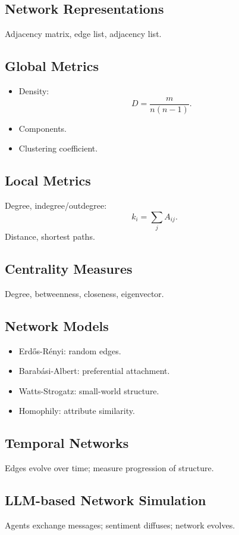 \documentclass[12pt]{article}
\begin{document}
\subsection*{Network Representations}
Adjacency matrix, edge list, adjacency list.

\subsection*{Global Metrics}
\begin{itemize}
    \item Density: 
    \[
    D = \frac{m}{n(n-1)}.
    \]
    \item Components.
    \item Clustering coefficient.
\end{itemize}

\subsection*{Local Metrics}
Degree, indegree/outdegree:
\[
k_i = \sum_j A_{ij}.
\]
Distance, shortest paths.

\subsection*{Centrality Measures}
Degree, betweenness, closeness, eigenvector.

\subsection*{Network Models}
\begin{itemize}
    \item Erd\H{o}s-R\'enyi: random edges.
    \item Barab\'asi-Albert: preferential attachment.
    \item Watts-Strogatz: small-world structure.
    \item Homophily: attribute similarity.
\end{itemize}

\subsection*{Temporal Networks}
Edges evolve over time; measure progression of structure.

\subsection*{LLM-based Network Simulation}
Agents exchange messages; sentiment diffuses; network evolves.
\end{document}
